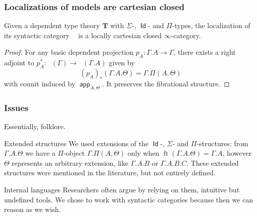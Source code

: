 \documentclass{beamer}
\DeclareMathOperator{\Id}{\mathsf{Id}}
\DeclareMathOperator{\ft}{ft}
\DeclareMathOperator{\app}{\mathsf{app}}
\DeclareMathOperator{\Syn}{\mathsf{Syn}(\mathbf{T})}
\begin{document}
\begin{frame}
  \frametitle{Localizations of models are cartesian closed}

  \begin{thm}[Kapulkin 2015]
    Given a dependent type theory $\mathbf{T}$ with $\Sigma$-, $\Id$- and
    $\Pi$-types, the localization of its syntactic category $\Syn$ is a
    locally cartesian closed $\infty$-category.
  \end{thm}
  \pause

  \begin{proof}
    For any basic dependent projection $p_A\colon\Gamma.A\rightarrow\Gamma$,
    there exists a right adjoint to
    $p_A^*\colon\Syn(\Gamma)\rightarrow\Syn(\Gamma.A)$ given by
    \[(p_A)_*(\Gamma.A.\Theta)=\Gamma.\Pi(A,\Theta)\]
    with counit induced by $\app_{A,\Theta}$. It preserves the fibrational
    structure.
  \end{proof}
\end{frame}

\begin{frame}
\end{frame}

\begin{frame}
  \frametitle{Issues}

  Essentially, folklore.

  \begin{block}{Extended structures}
  We used extensions of the $\Id$-, $\Sigma$- and $\Pi$-structures: from
  $\Gamma.A.\Theta$ we have a $\Pi$-object $\Gamma.\Pi(A,\Theta)$ only when
  $\ft(\Gamma.A.\Theta)=\Gamma.A$, however $\Theta$ represents an arbitrary
  extension, like $\Gamma.A.B$ or $\Gamma.A.B.C$.
  These extended structures
  were mentioned in the literature, but not entirely defined.
  \end{block}

  \begin{block}{Internal languages}
  Researchers often argue by relying on them, intuitive but undefined tools. We
  chose to work with syntactic categories because then we can reason as we wish.
  \end{block}
\end{frame}
\end{document}
